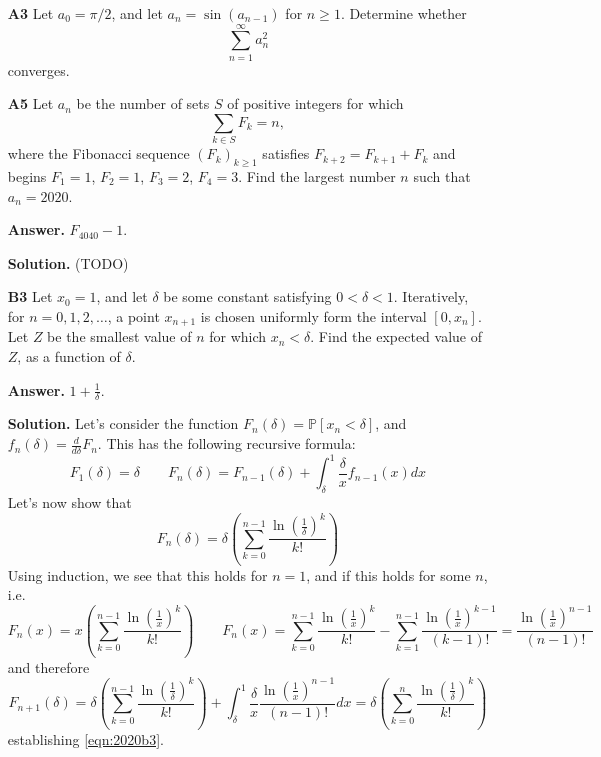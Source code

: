 \documentclass[11pt,a4paper]{article}
\newcommand{\bbP}{\mathbb P}
\newcommand{\<}{\langle}
\renewcommand{\>}{\rangle}
\begin{document}
\begin{enumerate}
    \item [\textbf{A3}] 
    Let $a_0=\pi /2$, and let $a_n=\sin (a_{n-1})$ for $n\ge 1$. Determine whether
    \[ \sum_{n=1}^{\infty}a_n^2 \]converges.
	
	\item [\textbf{A5}] 
	Let $a_n$ be the number of sets $S$ of positive integers for which
	\[ \sum_{k\in S}F_k=n,\]where the Fibonacci sequence $(F_k)_{k\ge 1}$ satisfies $F_{k+2}=F_{k+1}+F_k$ and begins $F_1=1$, $F_2=1$, $F_3=2$, $F_4=3$. Find the largest number $n$ such that $a_n=2020$.
	
	\textbf{Answer.} $F_{4040}-1$. 
	
	\textbf{Solution.} (TODO)
	
	\item [\textbf{B3}] Let $x_0=1$, and let $\delta$ be some constant satisfying $0<\delta<1$. Iteratively, for $n=0,1,2,\dots$, a point $x_{n+1}$ is chosen uniformly form the interval $[0,x_n]$. Let $Z$ be the smallest value of $n$ for which $x_n<\delta$. Find the expected value of $Z$, as a function of $\delta$.
	
	\textbf{Answer.} $1+\frac{1}{\delta}$. 
	
	\textbf{Solution.} 
	Let's consider the function $F_n(\delta)=\bbP[x_n<\delta]$, and $f_n(\delta)=\frac{d}{d\delta}F_n$. 
	This has the following recursive formula: 
	\[
	F_1(\delta)=\delta 
	\qquad 
	F_n(\delta) = F_{n-1}(\delta) + \int_{\delta}^1 \frac{\delta}{x} f_{n-1}(x)dx
	\]
	Let's now show that 
	\begin{equation}\label{eqn:2020b3}
	  F_n(\delta)=\delta\left(\sum_{k=0}^{n-1}\frac{\ln (\frac{1}{\delta})^k}{k!}\right)
	\end{equation}
	Using induction, we see that this holds for $n=1$, and if this holds for some $n$, i.e. 
	\[
	F_n(x)=x\left(\sum_{k=0}^{n-1}\frac{\ln (\frac{1}{x})^k}{k!}\right)
	\qquad 
	F_n(x) = \sum_{k=0}^{n-1}\frac{\ln (\frac{1}{x})^k}{k!} - \sum_{k=1}^{n-1}\frac{\ln (\frac{1}{x})^{k-1}}{(k-1)!}
	=\frac{\ln (\frac{1}{x})^{n-1}}{(n-1)!}
	\]
	and therefore 
	\[
	F_{n+1}(\delta)=
	\delta\left(\sum_{k=0}^{n-1}\frac{\ln (\frac{1}{\delta})^k}{k!}\right)
	+\int_{\delta}^1 \frac{\delta}{x} \frac{\ln (\frac{1}{x})^{n-1}}{(n-1)!}dx
	=\delta\left(\sum_{k=0}^{n}\frac{\ln (\frac{1}{\delta})^k}{k!}\right)
	\]
	establishing \ref{eqn:2020b3}. 
	

\end{enumerate}
\end{document}
